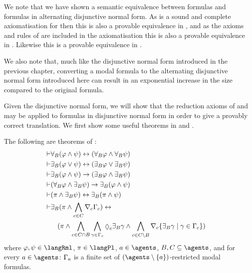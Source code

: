 We note that we have shown a semantic equivalence between \langMl{} formulas and formulas in alternating disjunctive normal form.
As \axiomKFF{} is a sound and complete axiomatisation for \logicKFF{} then this is also a provable equivalence in \axiomKFF{}, and as the axioms and rules of \axiomKFF{} are included in the axiomatisation \axiomRmlKFF{} this is also a provable equivalence in \axiomRmlKFF{}.
Likewise this is a provable equivalence in \axiomRmlKD{}.

We also note that, much like the disjunctive normal form introduced in the previous chapter, converting a modal formula to the alternating disjunctive normal form introduced here can result in an exponential increase in the size compared to the original formula.

Given the disjunctive normal form, we will show that the reduction axioms of \axiomRmlKFF{} and \axiomRmlKD{} may be applied to formulas in disjunctive normal form in order to give a provably correct translation.
We first show some useful theorems in \axiomRmlKFF{} and \axiomRmlKD{}.

\begin{lemma}\label{rml-k45-theorems}
The following are theorems of \axiomRmlKFF{}:
\begin{align}
    \proves & \allrefsBs (\phi \land \psi) \iff (\allrefsBs \phi \land \allrefsBs \psi) \label{rml-k45-and}\\
    \proves & \somerefsBs (\phi \lor \psi) \iff (\somerefsBs \phi \lor \somerefsBs \psi) \label{rml-k45-or}\\
    \proves & \somerefsBs (\phi \land \psi) \implies (\somerefsBs \phi \land \somerefsBs \psi) \label{rml-k45-d-and}\\
    \proves & (\allrefsBs \phi \land \somerefsBs \psi) \implies \somerefsBs (\phi \land \psi) \label{rml-k45-db-and}\\
    \proves & (\pi \land \somerefsBs \psi) \iff \somerefsBs (\pi \land \psi) \label{rml-k45-pd-and}\\
    \proves & \displaystyle \somerefsBs (\pi \land \bigwedge_{\agentC \in \agentsC} \coverC \Gamma_\agentC) \iff \nonumber\\
            & \displaystyle \quad
            (
            \pi \land
            \bigwedge_{\agentC \in \agentsC \cap \agentsB} \bigwedge_{\gamma \in \Gamma_\agentC} \possibleC \somerefsBs \gamma \land
            \bigwedge_{\agentC \in \agentsC \setminus \agentsB} \coversC \{\somerefsBs \gamma \mid \gamma \in \Gamma_\agentC\} 
            ) \label{rml-k45-cover}
\end{align}
where $\phi, \psi \in \langRml$, $\pi \in \langPl$, $\agentA \in \agents$, $\agentsB, \agentsC \subseteq \agents$, and for every $\agentA \in \agents$: $\Gamma_a$ is a finite set of $(\agents \setminus \{\agentA\})$-restricted modal formulas.
\end{lemma}

